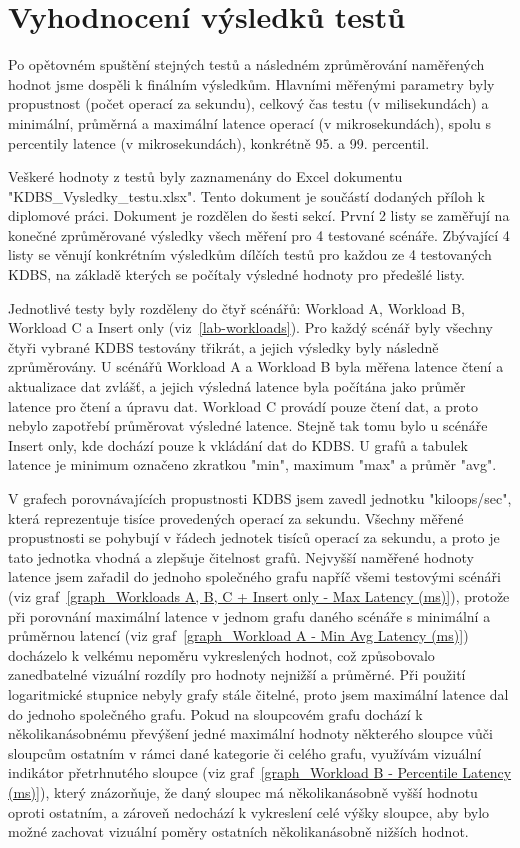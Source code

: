\documentclass[czech,master,dept460,male,csharp,cpdeclaration]{diploma}
\begin{document}
	\section{Vyhodnocení výsledků testů}
	
	Po opětovném spuštění stejných testů a následném zprůměrování naměřených hodnot jsme dospěli k finálním výsledkům. Hlavními měřenými parametry byly propustnost (počet operací za sekundu), celkový čas testu (v milisekundách) a minimální, průměrná a maximální latence operací (v mikrosekundách), spolu s percentily latence (v mikrosekundách), konkrétně 95. a 99. percentil.
	
	Veškeré hodnoty z testů byly zaznamenány do Excel dokumentu~\cite{excel} "KDBS\_Vysledky\_testu.xlsx". Tento dokument je součástí dodaných příloh k diplomové práci. Dokument je rozdělen do šesti sekcí. První 2 listy se zaměřují na konečné zprůměrované výsledky všech měření pro 4 testované scénáře. Zbývající 4 listy se věnují konkrétním výsledkům dílčích testů pro každou ze 4 testovaných KDBS, na základě kterých se počítaly výsledné hodnoty pro předešlé listy.
	
	Jednotlivé testy byly rozděleny do čtyř scénářů: Workload A, Workload B, Workload C a Insert only (viz~\ref{lab-workloads}). Pro každý scénář byly všechny čtyři vybrané KDBS testovány třikrát, a jejich výsledky byly následně zprůměrovány. U scénářů Workload A a Workload B byla měřena latence čtení a aktualizace dat zvlášť, a jejich výsledná latence byla počítána jako průměr latence pro čtení a úpravu dat. Workload C provádí pouze čtení dat, a proto nebylo zapotřebí průměrovat výsledné latence. Stejně tak tomu bylo u scénáře Insert only, kde dochází pouze k vkládání dat do KDBS. U grafů a tabulek latence je minimum označeno zkratkou "min", maximum "max" a průměr "avg".
	
	V grafech porovnávajících propustnosti KDBS jsem zavedl jednotku "kiloops/sec", která reprezentuje tisíce provedených operací za sekundu. Všechny měřené propustnosti se pohybují v řádech jednotek tisíců operací za sekundu, a proto je tato jednotka vhodná a zlepšuje čitelnost grafů. Nejvyšší naměřené hodnoty latence jsem zařadil do jednoho společného grafu napříč všemi testovými scénáři (viz graf~\ref{graph_Workloads A, B, C + Insert only - Max Latency (ms)}), protože při porovnání maximální latence v jednom grafu daného scénáře s minimální a průměrnou latencí (viz graf~\ref{graph_Workload A - Min Avg Latency (ms)}) docházelo k velkému nepoměru vykreslených hodnot, což způsobovalo zanedbatelné vizuální rozdíly pro hodnoty nejnižší a průměrné. Při použití logaritmické stupnice nebyly grafy stále čitelné, proto jsem maximální latence dal do jednoho společného grafu. Pokud na sloupcovém grafu dochází k několikanásobnému převýšení jedné maximální hodnoty některého sloupce vůči sloupcům ostatním v rámci dané kategorie či celého grafu, využívám vizuální indikátor přetrhnutého sloupce (viz graf~\ref{graph_Workload B - Percentile Latency (ms)}), který znázorňuje, že daný sloupec má několikanásobně vyšší hodnotu oproti ostatním, a zároveň nedochází k vykreslení celé výšky sloupce, aby bylo možné zachovat vizuální poměry ostatních několikanásobně nižších hodnot.
	
\end{document}
